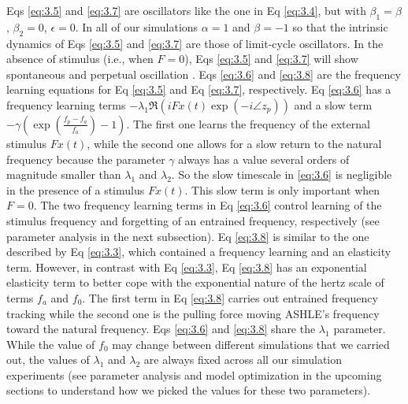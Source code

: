 \documentclass{report}
\begin{document}
Eqs \eqref{eq:3.5} and \eqref{eq:3.7} are oscillators like the one in Eq \eqref{eq:3.4}, but with $\beta_1 = \beta$, $\beta_2=0$, $\epsilon=0$. In all of our simulations $\alpha=1$ and $\beta=-1$ so that the intrinsic dynamics of Eqs \eqref{eq:3.5} and \eqref{eq:3.7} are those of limit-cycle oscillators. In the absence of stimulus (i.e., when $F = 0$), Eqs \eqref{eq:3.5} and \eqref{eq:3.7} will show spontaneous and perpetual oscillation \cite{kim2015signal}. Eqs \eqref{eq:3.6} and \eqref{eq:3.8} are the frequency learning equations for Eq \eqref{eq:3.5} and Eq \eqref{eq:3.7}, respectively. Eq \eqref{eq:3.6} has a frequency learning terms $-\lambda_1\Re\left( iFx(t)\exp(-i\angle z_p) \right)$ and a slow term $-\gamma\left( \exp\left(\frac{f_p-f_a}{f_a}\right)-1 \right)$. The first one learns the frequency of the external stimulus $Fx(t)$, while the second one allows for a slow return to the natural frequency because the parameter $\gamma$ always has a value several orders of magnitude smaller than $\lambda_1$ and $\lambda_2$. So the slow timescale in \eqref{eq:3.6} is negligible in the presence of a stimulus $Fx(t)$. This slow term is only important when $F = 0$. The two frequency learning terms in Eq \eqref{eq:3.6} control learning of the stimulus frequency and forgetting of an entrained frequency, respectively (see parameter analysis in the next subsection). Eq \eqref{eq:3.8} is similar to the one described by Eq \eqref{eq:3.3}, which contained a frequency learning and an elasticity term. However, in contrast with Eq \eqref{eq:3.3}, Eq \eqref{eq:3.8} has an exponential elasticity term to better cope with the exponential nature of the hertz scale of terms $f_a$ and $f_0$. The first term in Eq \eqref{eq:3.8} carries out entrained frequency tracking while the second one is the pulling force moving ASHLE's frequency toward the natural frequency. Eqs \eqref{eq:3.6} and \eqref{eq:3.8} share the $\lambda_1$ parameter. While the value of $f_0$ may change between different simulations that we carried out, the values of $\lambda_1$ and $\lambda_2$ are always fixed across all our simulation experiments (see parameter analysis and model optimization in the upcoming sections to understand how we picked the values for these two parameters).
\end{document}

